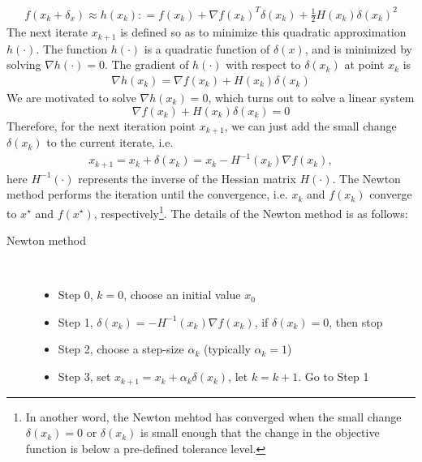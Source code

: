 \documentclass  [
  paper    = a4,
  BCOR     = 10mm,
  twoside,
  fontsize = 12pt,
  fleqn,
  toc      = bibnumbered,
  toc      = listofnumbered,
  numbers  = noendperiod,
  headings = normal,
  listof   = leveldown,
  version  = 3.03
]                                       {scrreprt}
\newcommand{\<}{\langle}
\renewcommand{\>}{\rangle}
\begin{document}
\begin{align*}
	f(x_k + \delta_x) \approx h(x_k) : = f(x_k) + \nabla f(x_k)^T\delta(x_k) +\frac{1}{2}H(x_k)\delta(x_k)^2 
\end{align*}
The next iterate $x_{k+1}$ is defined so as to minimize this quadratic approximation $h(\cdot)$. The function $h(\cdot)$ is a quadratic function of $\delta(x)$, and is minimized by solving $\nabla h(\cdot) = 0$. The gradient of $h(\cdot)$ with respect to $\delta(x_k)$ at point $x_k$ is
\begin{align*}
	\nabla h(x_k) = \nabla f(x_k) + H(x_k) \delta(x_k) 
\end{align*}
We are motivated to solve $\nabla h(x_k) =0$, which turns out to solve a linear system
\begin{equation}
	\nabla f(x_k) + H(x_k) \delta(x_k) =0
	\label{HessianEq}
\end{equation}
Therefore, for the next iteration point $x_{k+1}$, we can just add the small change $\delta(x_k)$ to the current iterate, i.e. 
\begin{align*}
	x_{k+1}  = x_k + \delta(x_k) = x_k - H^{-1}(x_k)\nabla f(x_k), 
\end{align*}
here $ H^{-1}(\cdot)$ represents the inverse of the Hessian matrix $H(\cdot)$. The Newton method performs the iteration until the convergence, i.e. $x_k$ and $f(x_k)$ converge to $x^\star$ and $f(x^\star)$, respectively\footnote{In another word, the Newton mehtod has converged when the small change $\delta(x_k) =0$ or $\delta(x_k)$ is small enough that the change in the objective function is below a pre-defined tolerance level.}. The details of the Newton method is as follows: 
\begin{description}
	\item[Newton method]\ 
	\begin{itemize}
		\item Step 0, $k=0$, choose an initial value $x_0$ 
		\item Step 1, $\delta(x_k)  =- H^{-1}(x_k)\nabla f(x_k)$, if $\delta(x_k) =0$, then stop
		\item Step 2, choose a step-size $\alpha_k$ (typically $\alpha_k =1$)
		\item Step 3, set $x_{k+1}  = x_k + \alpha_k \delta(x_k) $, let $k= k+1$. Go to Step 1
	\end{itemize}
\end{description}
\end{document}
